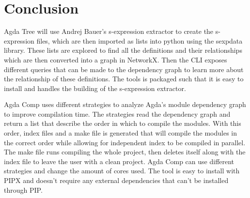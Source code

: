 
\section{Conclusion}

Agda Tree will use Andrej Bauer's s-expression extractor to create the
s-expression files, which are then imported as lists into python using the
sexpdata library. These lists are explored to find all the definitions and
their relationships which are then converted into a graph in NetworkX.  Then
the CLI exposes different queries that can be made to the dependency graph to
learn more about the relationship of these definitions. The tools is packaged
such that it is easy to install and handles the building of the s-expression
extractor.

Agda Comp uses different strategies to analyze Agda's module dependency graph
to improve compilation time. The strategies read the dependency graph and
return a list that describe the order in which to compile the modules. With
this order, index files and a make file is generated that will compile the
modules in the correct order while allowing for independent index to be
compiled in parallel. The make file runs compiling the whole project, then
deletes itself along with the index file to leave the user with a clean
project. Agda Comp can use different strategies and change the amount of cores
used. The tool is easy to install with PIPX and doesn't require any external
dependencies that can't be installed through PIP.


